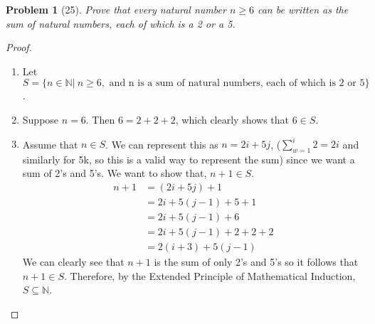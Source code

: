 \documentclass{article}
\theoremstyle{problem}
\newtheorem{prob}{Problem}
\theoremstyle{plain}
\begin{document}
  \begin{prob}[25]
    Prove that every natural number $n \geq 6$ can be written as the sum of natural numbers, each of which is a 2 or a 5.   
  \end{prob}
  \begin{proof}\
    \begin{enumerate}
      \item Let $S = \{n \in \mathbb{N}|\ n \geq 6,\text{ and n is a sum of natural numbers, each of which is 2 or 5}\}$.
      \item Suppose $n = 6$. Then $6 = 2 + 2 + 2$, which clearly shows that $6 \in S$.
      \item Assume that $n \in S$. We can represent this as $n = 2i + 5j$, ($\sum_{w=1}^{i} 2 = 2i$ and similarly for 5k, so this is a valid way to represent the sum) since we want a sum of 2's and 5's.  We want to show that, $n + 1 \in S$.
        \begin{align*}
          n + 1 &= (2i + 5j) + 1 \tag*{(Induction Hypothesis)}\\
                &= 2i + 5(j-1) + 5 + 1\\
                &= 2i + 5(j-1) + 6\\
                &= 2i + 5(j-1) + 2 + 2 + 2\\
                &= 2(i+3) + 5(j-1)
        \end{align*}
        We can clearly see that $n + 1$ is the sum of only 2's and 5's so it follows that $n+1 \in S$. Therefore, by the Extended Principle of Mathematical Induction, $S \subseteq \mathbb{N}$.
      \end{enumerate}
  \end{proof}
\end{document}
